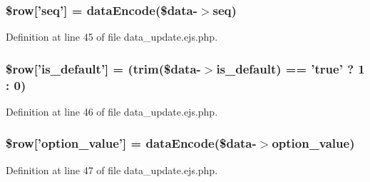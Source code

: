 \hypertarget{administration_2lists_2data__update_8ejs_8php_af07faae4f0734e368a485f115669527e}{
\subsubsection[{\$row}]{\setlength{\rightskip}{0pt plus 5cm}\$row\mbox{[}'seq'\mbox{]} = {\bf data\-Encode}(\$data-\/$>$seq)}}\label{administration_2lists_2data__update_8ejs_8php_af07faae4f0734e368a485f115669527e}


\-Definition at line 45 of file data\-\_\-update.\-ejs.\-php.

\hypertarget{administration_2lists_2data__update_8ejs_8php_afb2c758deaface994a3fbc212ded12cd}{
\subsubsection[{\$row}]{\setlength{\rightskip}{0pt plus 5cm}\$row\mbox{[}'is\-\_\-default'\mbox{]} = (trim(\$data-\/$>$is\-\_\-default) == 'true' ? 1 \-: 0)}}\label{administration_2lists_2data__update_8ejs_8php_afb2c758deaface994a3fbc212ded12cd}


\-Definition at line 46 of file data\-\_\-update.\-ejs.\-php.

\hypertarget{administration_2lists_2data__update_8ejs_8php_a48eb30eb1a910d28f11f62cf48b97401}{
\subsubsection[{\$row}]{\setlength{\rightskip}{0pt plus 5cm}\$row\mbox{[}'option\-\_\-value'\mbox{]} = {\bf data\-Encode}(\$data-\/$>$option\-\_\-value)}}\label{administration_2lists_2data__update_8ejs_8php_a48eb30eb1a910d28f11f62cf48b97401}


\-Definition at line 47 of file data\-\_\-update.\-ejs.\-php.

